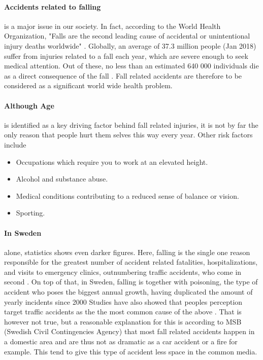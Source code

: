 \documentclass[12pt, a4paper, onecolumn]{article}
\begin{document}
\paragraph{Accidents related to falling} is a major issue in our society. In fact, according to the World Health Organization, "Falls are the second leading cause of accidental or unintentional injury deaths worldwide" \cite{who}. Globally, an average of 37.3 million people (Jan 2018) suffer from injuries related to a fall each year, which are severe enough to seek medical attention. Out of these, no less than an estimated 640 000 individuals die as a direct consequence of the fall \cite{who}. Fall  related accidents are therefore to be considered as a significant world wide health problem. 

\paragraph{Although Age} is identified as a key driving factor behind fall related injuries, it is not by far the only reason that people hurt them selves this way every year.  Other risk factors include 
	\begin{itemize}
		\item Occupations which require you to work at an elevated height.
		\item Alcohol and substance abuse.
		\item Medical conditions contributing to a reduced sense of balance or vision.
		\item Sporting.	
	\end{itemize}

\paragraph{In Sweden} alone, statistics shows even darker figures. Here, falling is the single one reason responsible for the greatest number of accident related fatalities, hospitalizations, and visits to emergency clinics, outnumbering traffic accidents, who come in second \cite[p~3,5]{msb_report}. On top of that, in Sweden, falling is together with poisoning, the type of accident who poses the biggest annual growth, having duplicated the amount of yearly incidents since 2000 \cite{soc_olyckor} Studies have also showed that peoples perception target traffic accidents as the the most common cause of the above \cite[p~5]{msb_report}. That is however not true, but a reasonable explanation for this is according to MSB (Swedish Civil Contingencies Agency) that most fall related accidents happen in a domestic area and are thus not as dramatic as a car accident or a fire for example. This tend to give this type of accident less space in the common media. 
\end{document}
